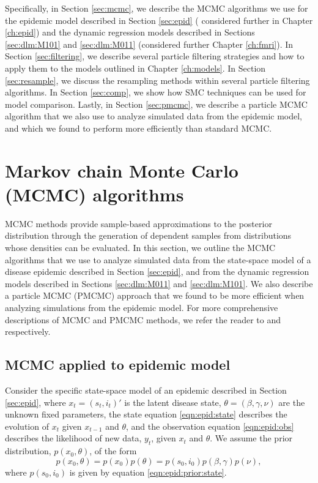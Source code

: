 Specifically, in Section \ref{sec:mcmc}, we describe the MCMC algorithms we use for the epidemic model described in Section \ref{sec:epid} ( considered further in Chapter \ref{ch:epid}) and the dynamic regression models described in Sections \ref{sec:dlm:M101} and \ref{sec:dlm:M011} (considered further Chapter \ref{ch:fmri}). In Section \ref{sec:filtering}, we describe several particle filtering strategies and how to apply them to the models outlined in Chapter \ref{ch:models}. In Section \ref{sec:resample}, we discuss the resampling methods within several particle filtering algorithms. In Section \ref{sec:comp}, we show how SMC techniques can be used for model comparison. Lastly, in Section \ref{sec:pmcmc}, we describe a particle MCMC algorithm that we also use to analyze simulated data from the epidemic model, and which we found to perform more efficiently than standard MCMC.

\section{Markov chain Monte Carlo (MCMC) algorithms \label{sec:mcmc}}

MCMC methods provide sample-based approximations to the posterior distribution through the generation of dependent samples from distributions whose densities can be evaluated. In this section, we outline the MCMC algorithms that we use to analyze simulated data from the state-space model of a disease epidemic described in Section \ref{sec:epid}, and from the dynamic regression models described in Sections \ref{sec:dlm:M011} and \ref{sec:dlm:M101}. We also describe a particle MCMC (PMCMC) approach that we found to be more efficient when analyzing simulations from the epidemic model. For more comprehensive descriptions of MCMC and PMCMC methods, we refer the reader to \citet{Robe:Case:mont:2004} and \citet{Andr:Douc:Hol:pmcmc:2010} respectively.

\subsection{MCMC applied to epidemic model \label{sec:mcmc:epid}}

Consider the specific state-space model of an epidemic described in Section \ref{sec:epid}, where $x_t = (s_t,i_t)'$ is the latent disease state, $\theta = (\beta,\gamma,\nu)$ are the unknown fixed parameters, the state equation \eqref{eqn:epid:state} describes the evolution of $x_t$ given $x_{t-1}$ and $\theta$, and the observation equation \eqref{eqn:epid:obs} describes the likelihood of new data, $y_t$, given $x_t$ and $\theta$. We assume the prior distribution, $p(x_0,\theta)$, of the form
\begin{equation}
p(x_0,\theta) = p(x_0)p(\theta) = p(s_0,i_0)p(\beta,\gamma)p(\nu), \label{eqn:epid:prior}
\end{equation}
where $p(s_0,i_0)$ is given by equation \eqref{eqn:epid:prior:state}.

